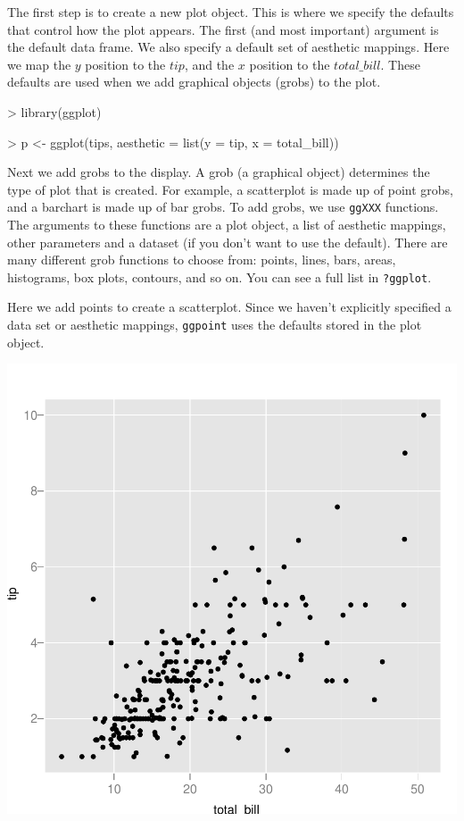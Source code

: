 \documentclass[]{article}
\begin{document}
The first step is to create a new plot object.  This is where we specify the defaults that control how the plot appears.  The first (and most important) argument is the default data frame.  We also specify a default set of aesthetic mappings.  Here we map the $y$ position to the $tip$, and the $x$ position to the $total\_bill$.  These defaults are used when we add graphical objects (grobs) to the plot.  

\begin{Schunk}
\begin{Sinput}
> library(ggplot)
\end{Sinput}
\end{Schunk}
\begin{Schunk}
\begin{Sinput}
> p <- ggplot(tips, aesthetic = list(y = tip, x = total_bill))
\end{Sinput}
\end{Schunk}

Next we add grobs to the display.  A grob (a graphical object) determines the type of plot that is created.  For example, a scatterplot is made up of point grobs, and a barchart is made up of bar grobs.  To add grobs, we use \texttt{ggXXX} functions.  The arguments to these functions are a plot object, a list of aesthetic mappings, other parameters and a dataset (if you don't want to use the default).  There are many different grob functions to choose from: points, lines, bars, areas, histograms, box plots, contours, and so on.  You can see a full list in \texttt{?ggplot}.   

Here we add points to create a scatterplot.  Since we haven't explicitly specified a data set or aesthetic mappings, \texttt{ggpoint} uses the defaults stored in the plot object.  

\includegraphics{introduction-003}
\end{document}
